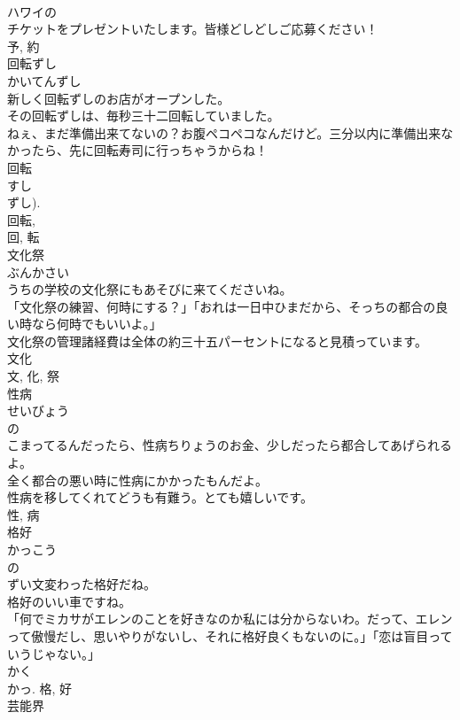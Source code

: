 \documentclass[8pt]{extreport}
\begin{document}
\begin{CJK}{UTF8}{min}
\\	ハワイの
\\	チケットをプレゼントいたします。皆様どしどしご応募ください！	
\\	予, 約	
\\	回転ずし	
\\	かいてんずし	
\\	新しく回転ずしのお店がオープンした。	
\\	その回転ずしは、毎秒三十二回転していました。	
\\	ねぇ、まだ準備出来てないの？お腹ペコペコなんだけど。三分以内に準備出来なかったら、先に回転寿司に行っちゃうからね！	
\\	回転 
\\	すし 
\\	ずし). 
\\	回転, 
\\	回, 転	
\\	文化祭	
\\	ぶんかさい	
\\	うちの学校の文化祭にもあそびに来てくださいね。	
\\	「文化祭の練習、何時にする？」「おれは一日中ひまだから、そっちの都合の良い時なら何時でもいいよ。」	
\\	文化祭の管理諸経費は全体の約三十五パーセントになると見積っています。	
\\	文化 
\\	文, 化, 祭	
\\	性病	
\\	せいびょう	
\\	の 
\\	こまってるんだったら、性病ちりょうのお金、少しだったら都合してあげられるよ。	
\\	全く都合の悪い時に性病にかかったもんだよ。	
\\	性病を移してくれてどうも有難う。とても嬉しいです。	
\\	性, 病	
\\	格好	
\\	かっこう	
\\	の 
\\	ずい文変わった格好だね。	
\\	格好のいい車ですね。	
\\	「何でミカサがエレンのことを好きなのか私には分からないわ。だって、エレンって傲慢だし、思いやりがないし、それに格好良くもないのに。」「恋は盲目っていうじゃない。」	
\\	かく 
\\	かっ.	格, 好	
\\	芸能界	

\end{CJK}
\end{document}
